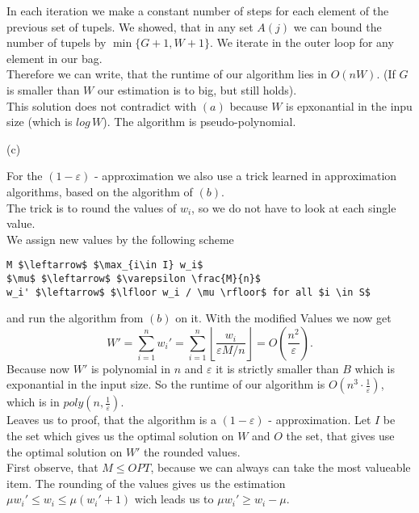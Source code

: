 \begin{description}
In each iteration we make a constant number of steps for each element of the previous set of tupels. We showed, that in any set $A(j)$ we can bound
the number of tupels by $\min \{ G + 1, W + 1 \}$. We iterate in the outer loop for any element in our bag. \\

Therefore we can write, that the runtime of our algorithm lies in $O(nW)$. (If $G$ is smaller than $W$ our estimation is to big, but still holds).\\

This solution does not contradict with $(a)$ because $W$ is epxonantial in the inpu size (which is $log \, W$). The algorithm is pseudo-polynomial.

\item{(c)}

For the $(1 - \varepsilon)$ - approximation we also use a trick learned in approximation algorithms, based on the algorithm of $(b)$.\\

The trick is to round the values of $w_i$, so we do not have to look at each single value.\\

We assign new values by the following scheme

\begin{lstlisting}
M $\leftarrow$ $\max_{i\in I} w_i$
$\mu$ $\leftarrow$ $\varepsilon \frac{M}{n}$
w_i' $\leftarrow$ $\lfloor w_i / \mu \rfloor$ for all $i \in S$
\end{lstlisting}

and run the algorithm from $(b)$ on it.
With the modified Values we now get
$$
W' = \underset{i=1}{\overset{n}{\sum}} w_i' = \underset{i=1}{\overset{n}{\sum}} \left\lfloor \frac{w_i}{\varepsilon M/n} \right\rfloor = O(\frac{n^2}{\varepsilon}).
$$
Because now $W'$ is polynomial in $n$ and $\varepsilon$ it is strictly smaller than $B$ which is exponantial in the input size. So the runtime of our algorithm
is $O(n^3 \cdot \frac{1}{\varepsilon})$, which is in $poly(n,\frac{1}{\varepsilon})$.\\

Leaves us to proof, that the algorithm is a $(1-\varepsilon)$ - approximation.
Let $I$ be the set which gives us the optimal solution on $W$ and $O$ the set, that gives use the optimal solution on $W'$ the rounded values.\\

First observe, that $M \leq OPT$, because we can always can take the most valueable item. The rounding of the values gives us the estimation 
$ \mu w_i' \leq w_i \leq \mu (w_i' + 1)$ wich leads us to $\mu w_i'  \geq w_i - \mu$.


\end{description}

